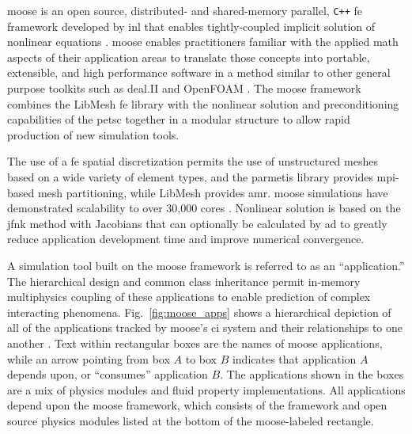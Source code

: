 \gls{moose} is an open source, distributed- and shared-memory parallel, \texttt{C++} \gls{fe} framework developed by \gls{inl} that enables tightly-coupled implicit solution of nonlinear equations \cite{gaston,moose}. \gls{moose} enables practitioners familiar with the applied math aspects of their application areas to translate those concepts into portable, extensible, and high performance software in a method similar to other general purpose toolkits such as deal.II \cite{dealII91} and OpenFOAM \cite{openfoam}. The \gls{moose} framework combines the LibMesh \gls{fe} library \cite{libMeshPaper} with the nonlinear solution and preconditioning capabilities of the \gls{petsc} together in a modular structure to allow rapid production of new simulation tools. 

The use of a \gls{fe} spatial discretization permits the use of unstructured meshes based on a wide variety of element types, and the \gls{parmetis} library provides \gls{mpi}-based mesh partitioning, while LibMesh provides \gls{amr}. \gls{moose} simulations have demonstrated scalability to over 30,000 cores \cite{kong}. Nonlinear solution is based on the \gls{jfnk} method with Jacobians that can optionally be calculated by \gls{ad} to greatly reduce application development time and improve numerical convergence. 

A simulation tool built on the \gls{moose} framework is referred to as an ``application.'' The hierarchical design and common class inheritance permit in-memory multiphysics coupling of these applications to enable prediction of complex interacting phenomena. Fig.\ \ref{fig:moose_apps} shows a hierarchical depiction of all of the applications tracked by \gls{moose}'s \gls{ci} system and their relationships to one another \cite{moose_training}. Text within rectangular boxes are the names of \gls{moose} applications, while an arrow pointing from box \(A\) to box \(B\) indicates that application \(A\) depends upon, or ``consumes'' application \(B\). The applications shown in the boxes are a mix of physics modules and fluid property implementations. All applications depend upon the \gls{moose} framework, which consists of the framework and open source physics modules listed at the bottom of the \gls{moose}-labeled rectangle.

